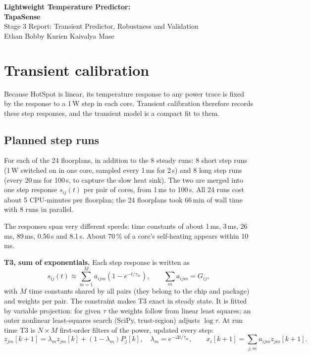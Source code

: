 \documentclass[11pt,a4paper]{article}
\begin{document}
\begin{center}
{\LARGE\bfseries Lightweight Temperature Predictor:}\\[4pt]
{\Large\bfseries TapaSense}\\[8pt]
{\large Stage 3 Report: Transient Predictor, Robustness and Validation}\\[6pt]
Ethan Bobby Kurien \quad Kaivalya Mase
\end{center}

\section{Transient calibration}
Because HotSpot is linear, its temperature response to any power trace is fixed by the response to
a 1\,W step in each core. Transient calibration therefore records these step responses, and the
transient model is a compact fit to them.

\subsection{Planned step runs}
For each of the 24 floorplans, in addition to the 8 steady runs: 8 short step runs (1\,W switched
on in one core, sampled every 1\,ms for 2\,s) and 8 long step runs (every 20\,ms for 100\,s, to
capture the slow heat sink). The two are merged into one step response $s_{ij}(t)$ per pair of
cores, from 1\,ms to 100\,s. All 24 runs cost about 5 CPU-minutes per floorplan; the 24
floorplans took 66\,min of wall time with 8 runs in parallel.

The responses span very different speeds: time constants of about 1\,ms, 3\,ms, 26\,ms, 89\,ms,
0.56\,s and 8.1\,s. About 70\,\% of a core's self-heating appears within 10\,ms.

\textbf{T3, sum of exponentials.} Each step response is written as
\begin{equation}
  s_{ij}(t) \approx \sum_{m=1}^{M} a_{ijm}\left(1 - e^{-t/\tau_m}\right),
  \qquad \sum_m a_{ijm} = G_{ij},
  \label{eq:t3}
\end{equation}
with $M$ time constants shared by all pairs (they belong to the chip and package) and weights per
pair. The constraint makes T3 exact in steady state. It is fitted by variable projection: for given
$\tau$ the weights follow from linear least squares; an outer nonlinear least-squares search (SciPy,
trust-region) adjusts $\log\tau$. At run time T3 is $N\times M$ first-order filters of the power,
updated every step:
\begin{equation}
  z_{jm}[k+1] = \lambda_m z_{jm}[k] + (1-\lambda_m) P_j[k],\quad \lambda_m = e^{-\Delta t/\tau_m},
  \qquad x_i[k+1] = \sum_{j,m} a_{ijm} z_{jm}[k+1].
  \label{eq:t3run}
\end{equation}
\end{document}
